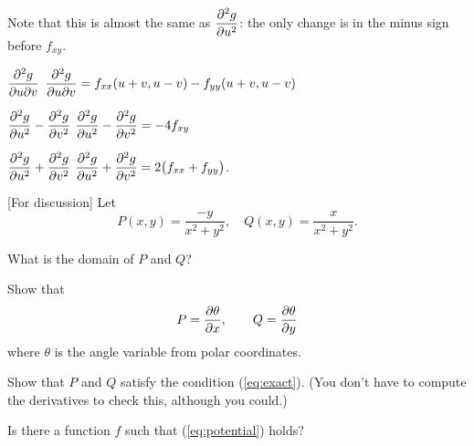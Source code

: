 \begin{multicols}{2}
Note that this is almost the same as $\dfrac{\partial^2g}{\partial u^2}$: the only change is in the minus sign before $f_{xy}$.
\endanswer

\subprob   $\dfrac{\partial^2 g}{\partial u\partial v}$
\answer
   $\displaystyle\frac{\partial^2 g}{\partial u\partial v}= f_{xx}(u+v, u-v) - f_{yy}(u+v, u-v)$
\endanswer

\subprob $\dfrac{\partial^2 g}{\partial u^2} - \dfrac{\partial^2 g}{\partial v^2}$
\answer
$\dfrac{\partial^2 g}{\partial u^2} - \dfrac{\partial^2 g}{\partial v^2} = -4f_{xy} $
\endanswer

\subprob $\dfrac{\partial^2 g}{\partial u^2} + \dfrac{\partial^2 g}{\partial v^2}$
\answer
$\dfrac{\partial^2 g}{\partial u^2} + \dfrac{\partial^2 g}{\partial v^2} = 2\bigl(f_{xx}+f_{yy}\bigr)$.
\endanswer

\problem\label{prb:grad-of-theta} 
[For discussion] Let 
\[
  P(x,y) = \frac{-y}{x^2+y^2},
  \quad
  Q(x,y) = \frac{x}{x^2+y^2}.
\]

\subprob What is the domain of $P$ and $Q$?

\subprob Show that
\[
  P = \frac{\partial \theta}{\partial x}, \qquad
  Q = \frac{\partial \theta}{\partial y}
\]
where $\theta$ is the angle variable from polar coordinates.

\subprob Show that $P$ and $Q$ satisfy the condition
(\ref{eq:exact}).  (You don't have to compute the derivatives to
check this, although you could.)

\subprob Is there a function $f$ such that (\ref{eq:potential}) holds?

\noproblemfont
\end{multicols}


